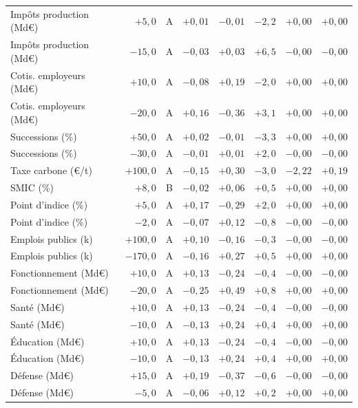 {\begin{longtable}{p{4.2cm}rcrrrrr}
Impôts production (Md€) & $+5{,}0$ & A & $+0{,}01$ & $-0{,}01$ & $-2{,}2$ & $+0{,}00$ & $+0{,}00$\\
Impôts production (Md€) & $-15{,}0$ & A & $-0{,}03$ & $+0{,}03$ & $+6{,}5$ & $-0{,}00$ & $-0{,}00$\\
Cotis. employeurs (Md€) & $+10{,}0$ & A & $-0{,}08$ & $+0{,}19$ & $-2{,}0$ & $+0{,}00$ & $+0{,}00$\\
Cotis. employeurs (Md€) & $-20{,}0$ & A & $+0{,}16$ & $-0{,}36$ & $+3{,}1$ & $+0{,}00$ & $+0{,}00$\\
Successions (\%) & $+50{,}0$ & A & $+0{,}02$ & $-0{,}01$ & $-3{,}3$ & $+0{,}00$ & $+0{,}00$\\
Successions (\%) & $-30{,}0$ & A & $-0{,}01$ & $+0{,}01$ & $+2{,}0$ & $-0{,}00$ & $-0{,}00$\\
Taxe carbone (€/t) & $+100{,}0$ & A & $-0{,}15$ & $+0{,}30$ & $-3{,}0$ & $-2{,}22$ & $+0{,}19$\\
SMIC (\%) & $+8{,}0$ & B & $-0{,}02$ & $+0{,}06$ & $+0{,}5$ & $+0{,}00$ & $+0{,}00$\\
Point d'indice (\%) & $+5{,}0$ & A & $+0{,}17$ & $-0{,}29$ & $+2{,}0$ & $+0{,}00$ & $+0{,}00$\\
Point d'indice (\%) & $-2{,}0$ & A & $-0{,}07$ & $+0{,}12$ & $-0{,}8$ & $-0{,}00$ & $-0{,}00$\\
Emplois publics (k) & $+100{,}0$ & A & $+0{,}10$ & $-0{,}16$ & $-0{,}3$ & $-0{,}00$ & $-0{,}00$\\
Emplois publics (k) & $-170{,}0$ & A & $-0{,}16$ & $+0{,}27$ & $+0{,}5$ & $+0{,}00$ & $+0{,}00$\\
Fonctionnement (Md€) & $+10{,}0$ & A & $+0{,}13$ & $-0{,}24$ & $-0{,}4$ & $-0{,}00$ & $-0{,}00$\\
Fonctionnement (Md€) & $-20{,}0$ & A & $-0{,}25$ & $+0{,}49$ & $+0{,}8$ & $+0{,}00$ & $+0{,}00$\\
Santé (Md€) & $+10{,}0$ & A & $+0{,}13$ & $-0{,}24$ & $-0{,}4$ & $-0{,}00$ & $-0{,}00$\\
Santé (Md€) & $-10{,}0$ & A & $-0{,}13$ & $+0{,}24$ & $+0{,}4$ & $+0{,}00$ & $+0{,}00$\\
Éducation (Md€) & $+10{,}0$ & A & $+0{,}13$ & $-0{,}24$ & $-0{,}4$ & $-0{,}00$ & $-0{,}00$\\
Éducation (Md€) & $-10{,}0$ & A & $-0{,}13$ & $+0{,}24$ & $+0{,}4$ & $+0{,}00$ & $+0{,}00$\\
Défense (Md€) & $+15{,}0$ & A & $+0{,}19$ & $-0{,}37$ & $-0{,}6$ & $-0{,}00$ & $-0{,}00$\\
Défense (Md€) & $-5{,}0$ & A & $-0{,}06$ & $+0{,}12$ & $+0{,}2$ & $+0{,}00$ & $+0{,}00$\\

\end{longtable}}
